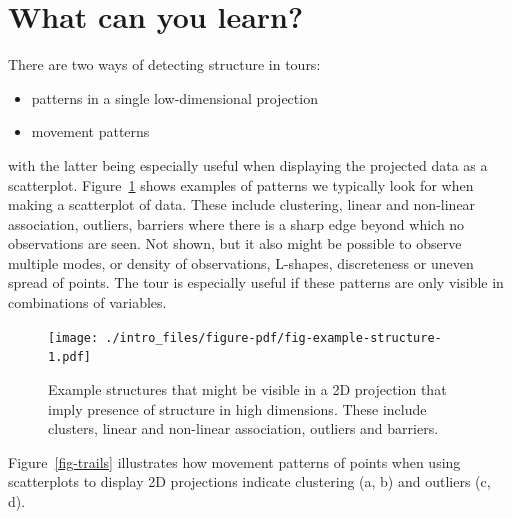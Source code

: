 \documentclass[
  letterpaper,
]{book}
\providecommand{\tightlist}{%
  \setlength{\itemsep}{0pt}\setlength{\parskip}{0pt}}\usepackage{longtable,booktabs,array}
\begin{document}
\hypertarget{what-can-you-learn}{%
\section{What can you learn?}\label{what-can-you-learn}}

There are two ways of detecting structure in tours:

\begin{itemize}
\tightlist
\item
  patterns in a single low-dimensional projection
\item
  movement patterns
\end{itemize}

with the latter being especially useful when displaying the projected
data as a scatterplot. Figure~\ref{fig-example-structure} shows examples
of patterns we typically look for when making a scatterplot of data.
These include clustering, linear and non-linear association, outliers,
barriers where there is a sharp edge beyond which no observations are
seen. Not shown, but it also might be possible to observe multiple
modes, or density of observations, L-shapes, discreteness or uneven
spread of points. The tour is especially useful if these patterns are
only visible in combinations of variables.

\begin{figure}

{\centering \texttt{[image: ./intro\_files/figure-pdf/fig-example-structure-1.pdf]}

}

\caption{\label{fig-example-structure}Example structures that might be
visible in a 2D projection that imply presence of structure in high
dimensions. These include clusters, linear and non-linear association,
outliers and barriers.}

\end{figure}

Figure~\ref{fig-trails} illustrates how movement patterns of points when
using scatterplots to display 2D projections indicate clustering (a, b)
and outliers (c, d).
\end{document}
